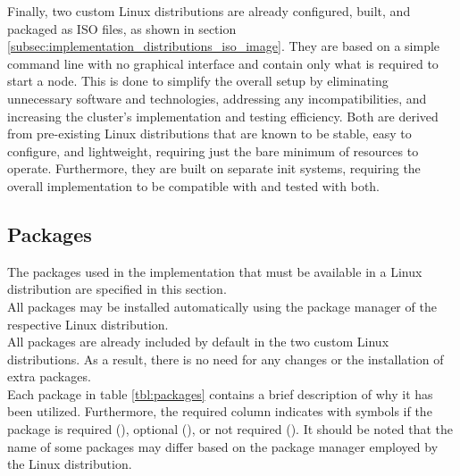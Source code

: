 Finally, two custom Linux distributions are already configured, built, and packaged
as ISO files, as shown in section
\ref{subsec:implementation_distributions_iso_image}. They are based on a simple command
line with no graphical interface and contain only what is required to start a node.
This is done to simplify the overall setup by eliminating unnecessary software
and technologies, addressing any incompatibilities, and increasing the cluster's
implementation and testing efficiency. Both are derived from pre-existing Linux distributions
that are known to be stable, easy to configure, and lightweight, requiring just
the bare minimum of resources to operate. Furthermore, they are built on
separate init systems, requiring the overall implementation to be compatible with
and tested with both.

\subsection{Packages}
\label{subsec:implementation_distributions_packages}

The packages used in the implementation that must be available in a Linux
distribution are specified in this section. \\ %
All packages may be installed automatically using the package manager of the
respective Linux distribution. \\ %
All packages are already included by default in the two custom Linux
distributions. As a result, there is no need for any changes or the installation
of extra packages. \\ %
Each package in table \ref{tbl:packages} contains a brief description of why it
has been utilized. Furthermore, the required column indicates with symbols if
the package is required (\textcolor{bulmaGreen}{}), optional (\textcolor{bulmaBlue}{}),
or not required (\textcolor{bulmaRed}{}). It should be noted that
the name of some packages may differ based on the package manager employed by
the Linux distribution.

